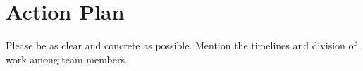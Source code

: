\section{Action Plan}

Please be as clear and concrete as possible. Mention the timelines and division of work among team members.